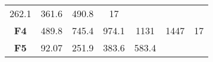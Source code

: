 \documentclass[12pt,a4paper]{article}
\begin{document}
\begin{longtable}[c]{@{}ccccccc@{}}
\begin{minipage}[t]{0.09\columnwidth}\centering\strut
262.1
\strut\end{minipage} &
\begin{minipage}[t]{0.10\columnwidth}\centering\strut
361.6
\strut\end{minipage} &
\begin{minipage}[t]{0.11\columnwidth}\centering\strut
490.8
\strut\end{minipage} &
\begin{minipage}[t]{0.07\columnwidth}\centering\strut
17
\strut\end{minipage}\tabularnewline
\begin{minipage}[t]{0.11\columnwidth}\centering\strut
\textbf{F4}
\strut\end{minipage} &
\begin{minipage}[t]{0.08\columnwidth}\centering\strut
489.8
\strut\end{minipage} &
\begin{minipage}[t]{0.08\columnwidth}\centering\strut
745.4
\strut\end{minipage} &
\begin{minipage}[t]{0.09\columnwidth}\centering\strut
974.1
\strut\end{minipage} &
\begin{minipage}[t]{0.10\columnwidth}\centering\strut
1131
\strut\end{minipage} &
\begin{minipage}[t]{0.11\columnwidth}\centering\strut
1447
\strut\end{minipage} &
\begin{minipage}[t]{0.07\columnwidth}\centering\strut
17
\strut\end{minipage}\tabularnewline
\begin{minipage}[t]{0.11\columnwidth}\centering\strut
\textbf{F5}
\strut\end{minipage} &
\begin{minipage}[t]{0.08\columnwidth}\centering\strut
92.07
\strut\end{minipage} &
\begin{minipage}[t]{0.08\columnwidth}\centering\strut
251.9
\strut\end{minipage} &
\begin{minipage}[t]{0.09\columnwidth}\centering\strut
383.6
\strut\end{minipage} &
\begin{minipage}[t]{0.10\columnwidth}\centering\strut
583.4
\strut\end{minipage} &

\end{longtable}
\end{document}
